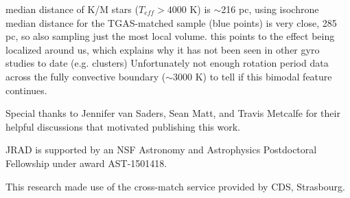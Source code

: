 \documentclass[manuscript, letterpaper]{aastex6}
\begin{document}
median distance of K/M stars ($T_{eff} > 4000$ K) is $\sim$216 pc, using isochrone
median distance for the TGAS-matched sample (blue points) is very close, 285 pc, so also sampling just the most local volume.
this points to the effect being localized around us, which explains why it has not been seen in other gyro studies to date (e.g. clusters)
Unfortunately not enough rotation period data across the fully convective boundary ($\sim$3000 K) to tell if this bimodal feature continues.




\acknowledgments
Special thanks to Jennifer van Saders, Sean Matt, and Travis Metcalfe for their helpful discussions that motivated publishing this work.

JRAD is supported by an NSF Astronomy and Astrophysics Postdoctoral Fellowship under award AST-1501418.

This research made use of the cross-match service provided by CDS, Strasbourg.


\end{document}
